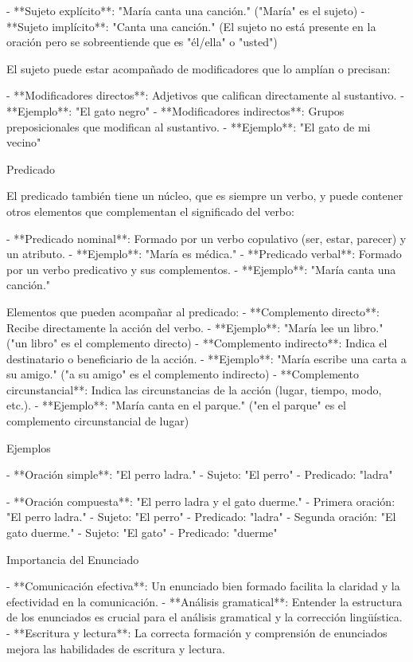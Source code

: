 - **Sujeto explícito**: "María canta una canción." ("María" es el sujeto)
- **Sujeto implícito**: "Canta una canción." (El sujeto no está presente en la oración pero se sobreentiende que es "él/ella" o "usted")

El sujeto puede estar acompañado de modificadores que lo amplían o precisan:

- **Modificadores directos**: Adjetivos que califican directamente al sustantivo.
- **Ejemplo**: "El gato negro"
- **Modificadores indirectos**: Grupos preposicionales que modifican al sustantivo.
- **Ejemplo**: "El gato de mi vecino"

Predicado

El predicado también tiene un núcleo, que es siempre un verbo, y puede contener otros elementos que complementan el significado del verbo:

- **Predicado nominal**: Formado por un verbo copulativo (ser, estar, parecer) y un atributo.
- **Ejemplo**: "María es médica."
- **Predicado verbal**: Formado por un verbo predicativo y sus complementos.
- **Ejemplo**: "María canta una canción."

Elementos que pueden acompañar al predicado:
- **Complemento directo**: Recibe directamente la acción del verbo.
- **Ejemplo**: "María lee un libro." ("un libro" es el complemento directo)
- **Complemento indirecto**: Indica el destinatario o beneficiario de la acción.
- **Ejemplo**: "María escribe una carta a su amigo." ("a su amigo" es el complemento indirecto)
- **Complemento circunstancial**: Indica las circunstancias de la acción (lugar, tiempo, modo, etc.).
- **Ejemplo**: "María canta en el parque." ("en el parque" es el complemento circunstancial de lugar)

Ejemplos

- **Oración simple**: "El perro ladra."
- Sujeto: "El perro"
- Predicado: "ladra"

- **Oración compuesta**: "El perro ladra y el gato duerme."
- Primera oración: "El perro ladra."
- Sujeto: "El perro"
- Predicado: "ladra"
- Segunda oración: "El gato duerme."
- Sujeto: "El gato"
- Predicado: "duerme"

Importancia del Enunciado

- **Comunicación efectiva**: Un enunciado bien formado facilita la claridad y la efectividad en la comunicación.
- **Análisis gramatical**: Entender la estructura de los enunciados es crucial para el análisis gramatical y la corrección lingüística.
- **Escritura y lectura**: La correcta formación y comprensión de enunciados mejora las habilidades de escritura y lectura.

